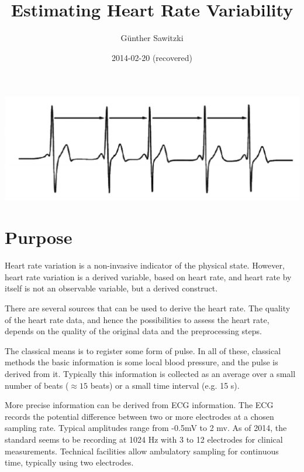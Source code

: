 \documentclass[a4paper, english, utf8]{amsart}
\title{Estimating Heart Rate Variability}
\author[G. Sawitzki]{G\"unther Sawitzki}
\date{2014-02-20 (recovered)}
\begin{document}
\maketitle
{\centering
\includegraphics[width=0.6\linewidth]{../media/hrv1}

}
{
\parskip 0pt

\tableofcontents
}
\bigskip


\section{Purpose}
Heart rate variation is a non-invasive indicator of the physical state.
However, heart rate variation is a derived variable, based on heart
rate, and heart rate by itself is not an observable variable, but a
derived construct.

There are several sources that can be used to derive the heart rate. The
quality of the heart rate data, and hence the possibilities to 
assess the heart rate, depends on the quality of the original data and
the preprocessing steps.

The classical means is to register some form of pulse. In all of these,
classical methods the basic information is some local blood pressure, and the pulse
is derived from it. Typically this information is collected as an average
over a small number of beats ($\approx 15$ beats) or a small time interval (e.g. 15 s).

More precise information can be derived from ECG information. The ECG
records the potential difference between two or more electrodes at a
chosen sampling rate. Typical amplitudes range from -0.5mV to 2 mv. As
of 2014, the standard seems to be recording at 1024 Hz with 3 to 12 electrodes for 
clinical measurements. Technical
facilities allow ambulatory sampling for continuous time, typically using two electrodes.
\end{document}
